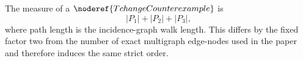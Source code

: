 \begin{definition}
The measure of a \(\noderef{TchangeCounterexample}\) is
\[
 |P_1|+|P_2|+|P_3|,
\]
where path length is the incidence-graph walk length.  This differs by
the fixed factor two from the number of exact multigraph edge-nodes used
in the paper and therefore induces the same strict order.
\end{definition}
